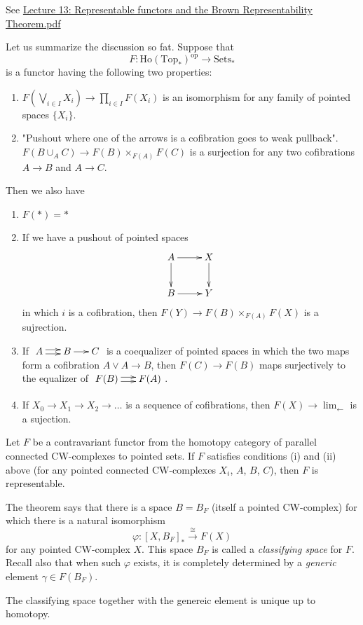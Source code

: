 See
\href{https://www.math.ru.nl/~gutierrez/%
files/Lecture13.pdf}{Lecture
13: Representable functors and the Brown
Representability Theorem.pdf}

Let us summarize the discussion so fat.
Suppose that
$$F:\text{Ho}(\text{Top}_*)^{\text{op}}\to
\text{Sets}_{*}$$
is a functor having the following two
properties:
\begin{enumerate}
	\item[(i)] $F\left( \bigvee_{i\in I}X_{i}
	\right) \to \prod_{i\in I}F(X_{i})$ is an
	isomorphism for any family of pointed spaces
	$\{X_{i}\} $.
\item[(ii)] "Pushout where one of the arrows
is a cofibration goes to weak pullback".
$F(B\cup_{A}C)\to F(B)\times_{F(A)} F(C)$ is
a surjection for any two cofibrations $A\to
B$ and $A\to C$.
\end{enumerate}

Then we also have
\begin{enumerate}
	\item[(iii)] $F(*)=*$
	\item[(iv)] If we have a pushout of pointed
	spaces
		$$
		\xymatrix{
			A\ar[r]\ar[d]&X\ar[d]\\
			B\ar[r]&Y
		}
		$$
		in which $i$ is a cofibration, then
		$F(Y)\to F(B)\times_{F(A)}F(X)$ is a
		sujrection.
	\item[(v)] If
	$\xymatrix@C=1.5em{A\ar@<.5ex>[r]\ar@<-
	.5ex>[r]&B\ar[r]&C}$
	is a coequalizer of pointed spaces in which
	the two maps form a cofibration $A\vee A\to
	B$, then $F(C)\to F(B)$ maps surjectively to
	the equalizer of
	$\xymatrix@C=1.5em{F(B)\ar@<.5ex>[r]\ar@<-
	.5ex>[r]&F(A)}$.
	\item[(vi)] If $X_{0}\to X_{1}\to X_{2}\to
	\ldots$ is a sequence of cofibrations, then
	$F(X)\to \lim_{\leftarrow}$ is a sujection.
\end{enumerate}

\begin{theorem}
\label{theorem-brown-repre-theor}
	Let $F$ be a contravariant functor from the
	homotopy category of parallel connected
	CW-complexes to pointed sets. If $F$
	satisfies conditions (i) and (ii) above (for
	any pointed connected CW-complexes $X_{i}$,
	$A$, $B$, $C$), then $F$ is representable.
\end{theorem}

\begin{remark}
\label{remark-so-what-is-a-classifying-space}
	The theorem says that there is a space
	$B=B_{F}$ (itself a pointed CW-complex) for
	which there is a natural isomorphism
	$$\varphi :[X,B_{F}]_{*}\overset{\cong
	}{\longrightarrow}F(X)$$
	for any pointed CW-complex $X$. This space
	$B_{F}$ is called a {\it classifying space}
	for $F$. Recall also that when such
	$\varphi$ exists, it is completely
	determined by a \textit{generic} element
	$\gamma\in F(B_{F})$.

	The classifying space together with the
	genereic element is unique up to homotopy.
\end{remark}

